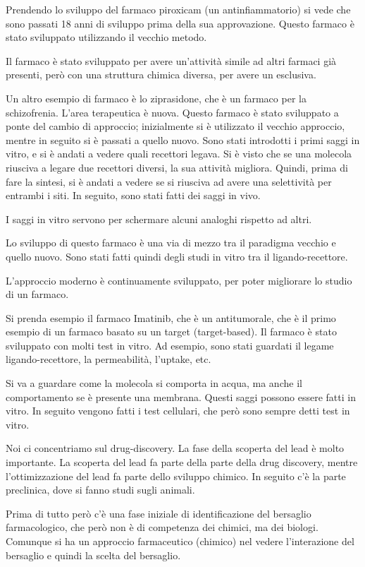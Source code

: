Prendendo lo sviluppo del farmaco piroxicam (un antinfiammatorio) si
vede che sono passati 18 anni di sviluppo prima della sua approvazione.
Questo farmaco è stato sviluppato utilizzando il vecchio metodo.

Il farmaco è stato sviluppato per avere un'attività simile ad altri
farmaci già presenti, però con una struttura chimica diversa, per avere
un esclusiva.

Un altro esempio di farmaco è lo ziprasidone, che è un farmaco per la
schizofrenia. L'area terapeutica è nuova. Questo farmaco è stato
sviluppato a ponte del cambio di approccio; inizialmente si è utilizzato
il vecchio approccio, mentre in seguito si è passati a quello nuovo.
Sono stati introdotti i primi saggi in vitro, e si è andati a vedere
quali recettori legava. Si è visto che se una molecola riusciva a legare
due recettori diversi, la sua attività migliora. Quindi, prima di fare
la sintesi, si è andati a vedere se si riusciva ad avere una selettività
per entrambi i siti. In seguito, sono stati fatti dei saggi in vivo.

I saggi in vitro servono per schermare alcuni analoghi rispetto ad
altri.

Lo sviluppo di questo farmaco è una via di mezzo tra il paradigma
vecchio e quello nuovo. Sono stati fatti quindi degli studi in vitro tra
il ligando-recettore.

L'approccio moderno è continuamente sviluppato, per poter migliorare lo
studio di un farmaco.

Si prenda esempio il farmaco Imatinib, che è un antitumorale, che è il
primo esempio di un farmaco basato su un target (target-based).
Il farmaco è stato sviluppato con molti test in vitro. Ad esempio, sono
stati guardati il legame ligando-recettore, la permeabilità, l'uptake,
etc.

Si va a guardare come la molecola si comporta in acqua, ma anche il
comportamento se è presente una membrana. Questi saggi possono essere
fatti in vitro.
In seguito vengono fatti i test cellulari, che però sono sempre detti
test in vitro.

Noi ci concentriamo sul drug-discovery. La fase della scoperta del lead
è molto importante.
La scoperta del lead fa parte della parte della drug discovery, mentre
l'ottimizzazione del lead fa parte dello sviluppo chimico.
In seguito c'è la parte preclinica, dove si fanno studi sugli animali.

Prima di tutto però c'è una fase iniziale di identificazione del
bersaglio farmacologico, che però non è di competenza dei chimici, ma
dei biologi. Comunque si ha un approccio farmaceutico (chimico) nel
vedere l'interazione del bersaglio e quindi la scelta del bersaglio.

